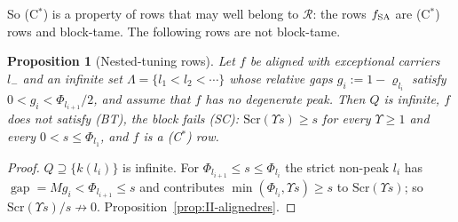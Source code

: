 \documentclass[10pt]{amsart}
\newtheorem{proposition}[theorem]{Proposition}
\theoremstyle{definition}
\theoremstyle{remark}
\newcommand{\gap}{\operatorname{gap}}
\newcommand{\Rec}{\mathcal R}
\begin{document}
So (C$^*$) is a property of rows that may well belong to $\Rec$: the rows
$f_{\rm SA}$ are (C$^*$) rows and block-tame.  The following rows are not block-tame.

\begin{proposition}[Nested-tuning rows]\label{prop:II-NT}
Let $f$ be aligned with exceptional carriers $l_-$ and an infinite set $\Lambda=\{l_1<
l_2<\cdots\}$ whose relative gaps $g_i:=1-\varrho_{l_i}$ satisfy $0<g_i<\Phi_{l_{i+1}}/2$, and
assume that $f$ has no degenerate peak.  Then $Q$ is infinite, $f$ does not satisfy
\textup{(BT)}, the block fails \textup{(SC)}: $\mathrm{Scr}(\Upsilon s)\ge s$ for every $\Upsilon\ge1$
and every $0<s\le\Phi_{l_1}$, and $f$ is a \textup{(C$^*$)} row.
\end{proposition}

\begin{proof}
$Q\supseteq\{k(l_i)\}$ is infinite.  For $\Phi_{l_{i+1}}\le s\le\Phi_{l_i}$ the strict non-peak $l_i$
has $\gap=Mg_i<\Phi_{l_{i+1}}\le s$ and contributes $\min(\Phi_{l_i},\Upsilon s)\ge s$ to
$\mathrm{Scr}(\Upsilon s)$; so $\mathrm{Scr}(\Upsilon s)/s\not\to0$.  Proposition~\ref{prop:II-alignedres}.
\end{proof}
\end{document}
